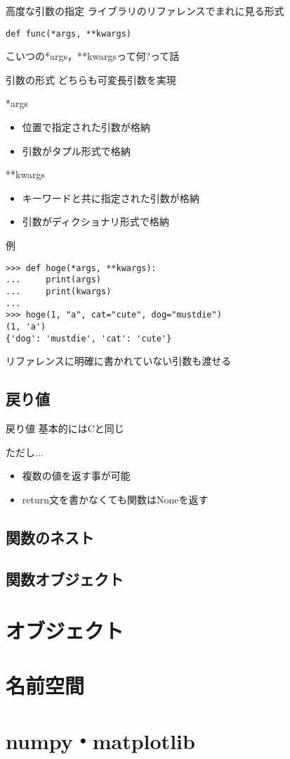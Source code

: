 \documentclass[12pt, xetex, xcolor=pdftex, dvipsnames]{beamer}
\begin{document}
\begin{frame}[fragile]{高度な引数の指定}
ライブラリのリファレンスでまれに見る形式

\begin{lstlisting}
def func(*args, **kwargs)
\end{lstlisting}

こいつの*args，**kwargsって何?って話
\end{frame}
\begin{frame}{引数の形式}
    どちらも\alert{可変長引数}を実現

    \begin{block}{*args}
        \begin{itemize}
            \item 位置で指定された引数が格納
            \item 引数がタプル形式で格納
        \end{itemize}
    \end{block}
    \begin{block}{**kwargs}
        \begin{itemize}
            \item キーワードと共に指定された引数が格納
            \item 引数がディクショナリ形式で格納
        \end{itemize}
    \end{block}
\end{frame}
\begin{frame}[fragile]{例}
\begin{lstlisting}
>>> def hoge(*args, **kwargs):
...     print(args)
...     print(kwargs)
...
>>> hoge(1, "a", cat="cute", dog="mustdie")
(1, 'a')
{'dog': 'mustdie', 'cat': 'cute'}
\end{lstlisting}
\pause

リファレンスに明確に書かれていない引数も渡せる
\end{frame}
\subsection{戻り値}
\begin{frame}{戻り値}
    基本的にはCと同じ

    ただし...
    \begin{itemize}
        \item 複数の値を返す事が可能
        \item return文を書かなくても関数はNoneを返す
    \end{itemize}
\end{frame}
\subsection{関数のネスト}
\subsection{関数オブジェクト}

\section{オブジェクト}

\section{名前空間}

\section{numpy・matplotlib}
\end{document}
